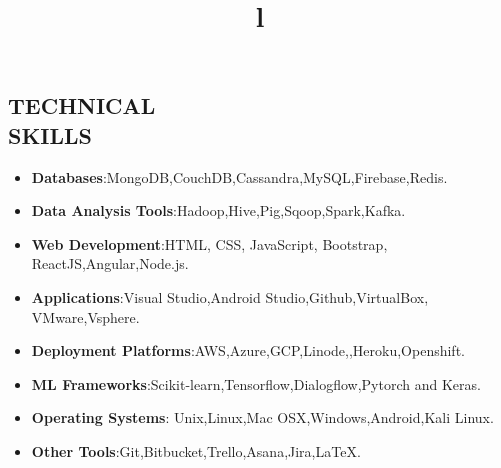 \documentclass[margin]{res}
\begin{document}
\begin{resume}
\section{TECHNICAL\\SKILLS}
\begin{itemize}
\item \textbf{Databases}:MongoDB,CouchDB,Cassandra,MySQL,Firebase,Redis.
\item \textbf{Data Analysis Tools}:Hadoop,Hive,Pig,Sqoop,Spark,Kafka.
\item \textbf{Web Development}:HTML, CSS, JavaScript, Bootstrap, ReactJS,Angular,Node.js.
\item \textbf{Applications}:Visual Studio,Android Studio,Github,VirtualBox, VMware,Vsphere.
\item {\textbf{Deployment Platforms}}:AWS,Azure,GCP,Linode,,Heroku,Openshift.
\item {\textbf{ML Frameworks}}:Scikit-learn,Tensorflow,Dialogflow,Pytorch and Keras.
\item \textbf{Operating Systems}: Unix,Linux,Mac OSX,Windows,Android,Kali Linux.
\item {\textbf{Other Tools}}:Git,Bitbucket,Trello,Asana,Jira,LaTeX.
\end{itemize}


\begin{format}
\title{l}\\
\\
\body\\
\end{format}


\end{resume}
\end{document}
